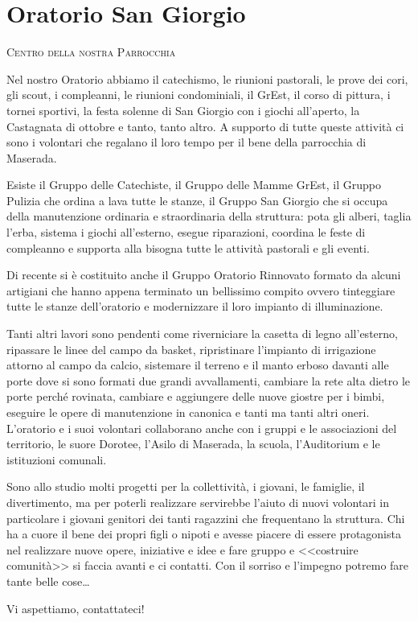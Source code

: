 \section{Oratorio San Giorgio}
\vspace{-1ex}
{\Large\scshape{Centro della nostra Parrocchia}}

Nel nostro Oratorio abbiamo il catechismo, le riunioni pastorali, le prove dei cori, gli scout, i compleanni, le riunioni condominiali, il GrEst, il corso di pittura, i tornei sportivi, la festa solenne di San Giorgio con i giochi all'aperto, la Castagnata di ottobre e tanto, tanto altro. A supporto di tutte queste attività ci sono i volontari che regalano il loro tempo per il bene della parrocchia di Maserada.

Esiste il Gruppo delle Catechiste, il Gruppo delle Mamme GrEst, il Gruppo Pulizia che ordina a lava tutte le stanze, il Gruppo San Giorgio che si occupa della manutenzione ordinaria e straordinaria della struttura: pota gli alberi, taglia l'erba, sistema i giochi all'esterno, esegue riparazioni, coordina le feste di compleanno e supporta alla bisogna tutte le attività pastorali e gli eventi.

Di recente si è costituito anche il Gruppo Oratorio Rinnovato formato da alcuni artigiani che hanno appena terminato un bellissimo compito ovvero tinteggiare tutte le stanze dell'oratorio e modernizzare il loro impianto di illuminazione.

Tanti altri lavori sono pendenti come riverniciare la casetta di legno all'esterno, ripassare le linee del campo da basket, ripristinare l'impianto di irrigazione attorno al campo da calcio, sistemare il terreno e il manto erboso davanti alle porte dove si sono formati due grandi avvallamenti, cambiare la rete alta dietro le porte perché rovinata, cambiare e aggiungere delle nuove giostre per i bimbi, eseguire le opere di manutenzione in canonica e tanti ma tanti altri oneri. L'oratorio e i suoi volontari collaborano anche con i gruppi e le associazioni del territorio, le suore Dorotee, l'Asilo di Maserada, la scuola, l'Auditorium e le istituzioni comunali.

Sono allo studio molti progetti per la collettività, i giovani, le famiglie, il divertimento, ma per poterli realizzare servirebbe l'aiuto di nuovi volontari in particolare i giovani genitori dei tanti ragazzini che frequentano la struttura. Chi ha a cuore il bene dei propri figli o nipoti e avesse piacere di essere protagonista nel realizzare nuove opere, iniziative e idee e fare gruppo e <<costruire comunità>> si faccia avanti e ci contatti. Con il sorriso e l'impegno potremo fare tante belle cose\ldots

Vi aspettiamo, contattateci!


